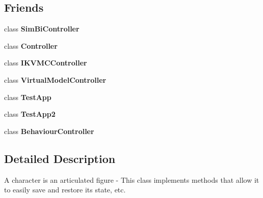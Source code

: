 \subsection*{Friends}
\begin{DoxyCompactItemize}
\item 
\hypertarget{classCartWheel_1_1Core_1_1Character_a32065a5c484f47dbe07fbc169bb53dc4}{
class {\bfseries SimBiController}}
\label{classCartWheel_1_1Core_1_1Character_a32065a5c484f47dbe07fbc169bb53dc4}

\item 
\hypertarget{classCartWheel_1_1Core_1_1Character_ac3456fd331a58b288082abca310c7a99}{
class {\bfseries Controller}}
\label{classCartWheel_1_1Core_1_1Character_ac3456fd331a58b288082abca310c7a99}

\item 
\hypertarget{classCartWheel_1_1Core_1_1Character_af5a47720698d4e89c90de04a3571a0dd}{
class {\bfseries IKVMCController}}
\label{classCartWheel_1_1Core_1_1Character_af5a47720698d4e89c90de04a3571a0dd}

\item 
\hypertarget{classCartWheel_1_1Core_1_1Character_a0b58594678c420e5766977afa192b210}{
class {\bfseries VirtualModelController}}
\label{classCartWheel_1_1Core_1_1Character_a0b58594678c420e5766977afa192b210}

\item 
\hypertarget{classCartWheel_1_1Core_1_1Character_a53f540ec72017006b082b2cb716644c1}{
class {\bfseries TestApp}}
\label{classCartWheel_1_1Core_1_1Character_a53f540ec72017006b082b2cb716644c1}

\item 
\hypertarget{classCartWheel_1_1Core_1_1Character_afc60a5a7cb2c98d03f699118d5e75af1}{
class {\bfseries TestApp2}}
\label{classCartWheel_1_1Core_1_1Character_afc60a5a7cb2c98d03f699118d5e75af1}

\item 
\hypertarget{classCartWheel_1_1Core_1_1Character_a780a8b03a34ab6eb2a7c3944c135ac33}{
class {\bfseries BehaviourController}}
\label{classCartWheel_1_1Core_1_1Character_a780a8b03a34ab6eb2a7c3944c135ac33}

\end{DoxyCompactItemize}


\subsection{Detailed Description}
A character is an articulated figure -\/ This class implements methods that allow it to easily save and restore its state, etc. 

